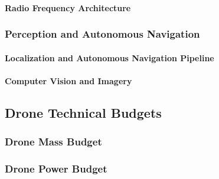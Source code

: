 \paragraph{Radio Frequency Architecture}
\label{par:drone_rf_architecture}



\subsubsection{Perception and Autonomous Navigation}
\label{subsubsec:drone_perception_navigation}

\paragraph{Localization and Autonomous Navigation Pipeline}
\label{par:drone_localization_navigation}


\paragraph{Computer Vision and Imagery}
\label{par:drone_computer_vision}



\subsection{Drone Technical Budgets}
\label{subsec:drone_technical_budgets}

\subsubsection{Drone Mass Budget}
\label{subsubsec:drone_mass_budget}


\subsubsection{Drone Power Budget}
\label{subsubsec:drone_power_budget}

